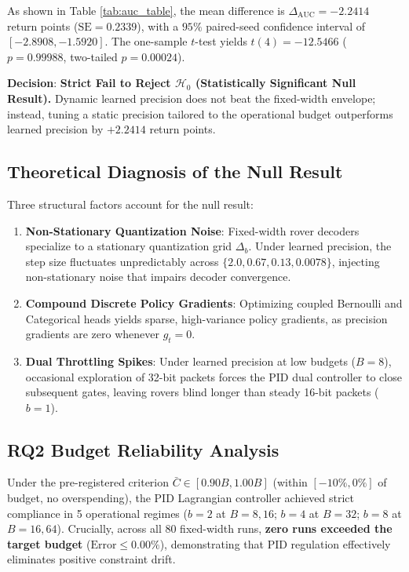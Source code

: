 \documentclass[10pt,twocolumn,letterpaper]{article}
\begin{document}
As shown in Table \ref{tab:auc_table}, the mean difference is $\Delta_{\mathrm{AUC}} = \mathbf{-2.2414}$ return points ($\mathrm{SE} = 0.2339$), with a $95\%$ paired-seed confidence interval of $\mathbf{[-2.8908, -1.5920]}$. The one-sample $t$-test yields $t(4) = -12.5466$ ($p = 0.99988$, two-tailed $p = 0.00024$).

\textbf{Decision}: \textbf{Strict Fail to Reject $\mathcal{H}_0$ (Statistically Significant Null Result).} Dynamic learned precision does not beat the fixed-width envelope; instead, tuning a static precision tailored to the operational budget outperforms learned precision by $+2.2414$ return points.

\subsection{Theoretical Diagnosis of the Null Result}
Three structural factors account for the null result:
\begin{enumerate}
    \item \textbf{Non-Stationary Quantization Noise}: Fixed-width rover decoders specialize to a stationary quantization grid $\Delta_b$. Under learned precision, the step size fluctuates unpredictably across $\{2.0, 0.67, 0.13, 0.0078\}$, injecting non-stationary noise that impairs decoder convergence.
    \item \textbf{Compound Discrete Policy Gradients}: Optimizing coupled Bernoulli and Categorical heads yields sparse, high-variance policy gradients, as precision gradients are zero whenever $g_t = 0$.
    \item \textbf{Dual Throttling Spikes}: Under learned precision at low budgets ($B=8$), occasional exploration of 32-bit packets forces the PID dual controller to close subsequent gates, leaving rovers blind longer than steady 16-bit packets ($b=1$).
\end{enumerate}

\subsection{RQ2 Budget Reliability Analysis}
Under the pre-registered criterion $\bar{C} \in [0.90 B, 1.00 B]$ (within $[-10\%, 0\%]$ of budget, no overspending), the PID Lagrangian controller achieved strict compliance in 5 operational regimes ($b=2$ at $B=8, 16$; $b=4$ at $B=32$; $b=8$ at $B=16, 64$). Crucially, across all 80 fixed-width runs, \textbf{zero runs exceeded the target budget} ($\text{Error} \le 0.00\%$), demonstrating that PID regulation effectively eliminates positive constraint drift.
\end{document}
